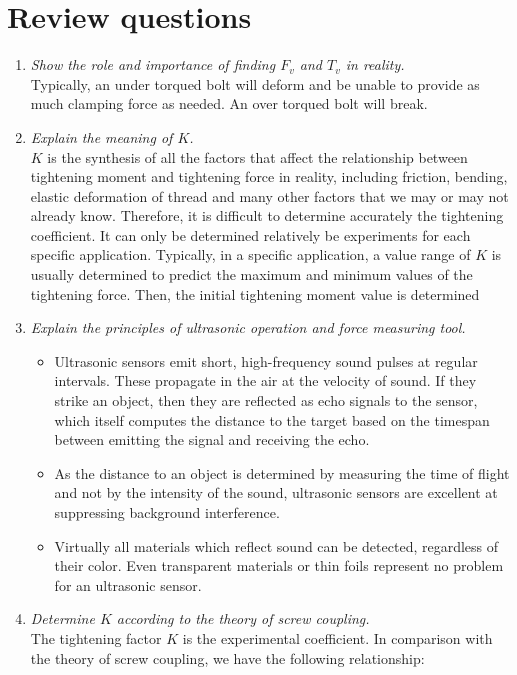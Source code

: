 \section{Review questions}
\begin{enumerate}
	\item \emph{Show the role and importance of finding $ F_v $ and $ T_v $ in reality.}\\
	Typically, an under torqued bolt will deform and be unable to provide as much clamping force as needed. An over torqued bolt will break.
	\item \emph{Explain the meaning of $ K $.}\\
	$ K $ is the synthesis of all the factors that affect the relationship between tightening moment and tightening force in reality, including friction, bending, elastic deformation of thread and many other factors that we may or may not already know. Therefore, it is difficult to determine accurately the tightening coefficient. It can only be determined relatively be experiments for each specific application. Typically, in a specific application, a value range of $ K $ is usually determined to predict the maximum and minimum values of the tightening force. Then, the initial tightening moment value is determined
	\item \emph{Explain the principles of ultrasonic operation and force measuring tool.}
	\begin{itemize}
		\item Ultrasonic sensors emit short, high-frequency sound pulses at regular intervals. These propagate in the air at the velocity of sound. If they strike an object, then they are reflected as echo signals to the sensor, which itself computes the distance to the target based on the timespan between emitting the signal and receiving the echo.
		\item As the distance to an object is determined by measuring the time of flight and not by the intensity of the sound, ultrasonic sensors are excellent at suppressing background interference.
		\item Virtually all materials which reflect sound can be detected, regardless of their color. Even transparent materials or thin foils represent no problem for an ultrasonic sensor.
	\end{itemize}	
	\item \emph{Determine $ K $ according to the theory of screw coupling.}\\
	The tightening factor $ K $ is the experimental coefficient. In comparison with the theory of screw coupling, we have the following relationship:

\end{enumerate}
